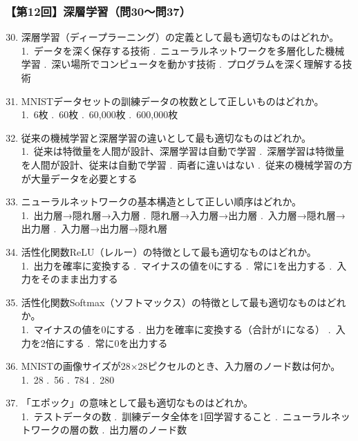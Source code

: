 \documentclass[b4paper,7pt,twocolumn,landscape]{jsarticle}
\begin{document}
\subsubsection*{【第12回】深層学習（問30〜問37）}

\begin{enumerate}
\setcounter{enumi}{29}
\item 深層学習（ディープラーニング）の定義として最も適切なものはどれか。\\
1.~データを深く保存する技術 .~ニューラルネットワークを多層化した機械学習 .~深い場所でコンピュータを動かす技術 .~プログラムを深く理解する技術

\item MNISTデータセットの訓練データの枚数として正しいものはどれか。\\
1.~6枚 .~60枚 .~60,000枚 .~600,000枚

\item 従来の機械学習と深層学習の違いとして最も適切なものはどれか。\\
1.~従来は特徴量を人間が設計、深層学習は自動で学習 .~深層学習は特徴量を人間が設計、従来は自動で学習 .~両者に違いはない .~従来の機械学習の方が大量データを必要とする

\item ニューラルネットワークの基本構造として正しい順序はどれか。\\
1.~出力層→隠れ層→入力層 .~隠れ層→入力層→出力層 .~入力層→隠れ層→出力層 .~入力層→出力層→隠れ層

\item 活性化関数ReLU（レルー）の特徴として最も適切なものはどれか。\\
1.~出力を確率に変換する .~マイナスの値を0にする .~常に1を出力する .~入力をそのまま出力する

\item 活性化関数Softmax（ソフトマックス）の特徴として最も適切なものはどれか。\\
1.~マイナスの値を0にする .~出力を確率に変換する（合計が1になる） .~入力を2倍にする .~常に0を出力する

\item MNISTの画像サイズが28×28ピクセルのとき、入力層のノード数は何か。\\
1.~28 .~56 .~784 .~280

\item 「エポック」の意味として最も適切なものはどれか。\\
1.~テストデータの数 .~訓練データ全体を1回学習すること .~ニューラルネットワークの層の数 .~出力層のノード数
\end{enumerate}
\end{document}
